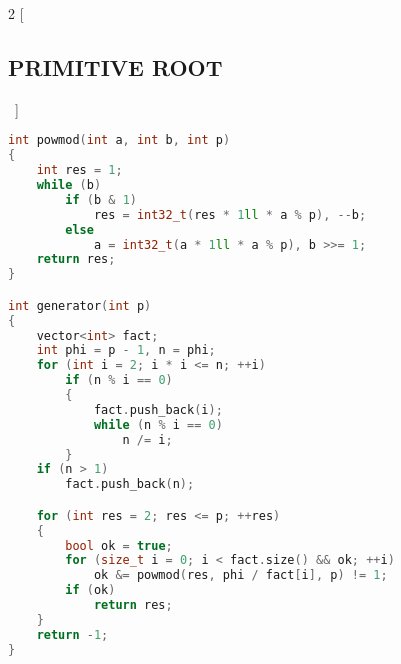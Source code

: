 \documentclass[leter]{amsart}
\begin{document}
\begin{multicols}{2}
[\subsection{PRIMITIVE ROOT}\ ]
\begin{lstlisting}[language=C++]
int powmod(int a, int b, int p)
{
    int res = 1;
    while (b)
        if (b & 1)
            res = int32_t(res * 1ll * a % p), --b;
        else
            a = int32_t(a * 1ll * a % p), b >>= 1;
    return res;
}

int generator(int p)
{
    vector<int> fact;
    int phi = p - 1, n = phi;
    for (int i = 2; i * i <= n; ++i)
        if (n % i == 0)
        {
            fact.push_back(i);
            while (n % i == 0)
                n /= i;
        }
    if (n > 1)
        fact.push_back(n);

    for (int res = 2; res <= p; ++res)
    {
        bool ok = true;
        for (size_t i = 0; i < fact.size() && ok; ++i)
            ok &= powmod(res, phi / fact[i], p) != 1;
        if (ok)
            return res;
    }
    return -1;
}

\end{lstlisting}
\end{multicols}
\end{document}
